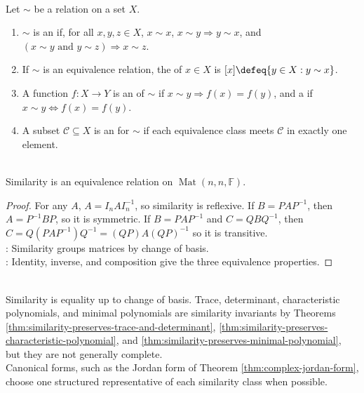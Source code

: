 \begin{definition} \label{def:equivalence-relation} \label{def:equivalence-classes-invariants-canonical-forms} \\
Let $\sim$ be a relation on a set $X$.
\begin{enumerate}[label=(\roman*)]
\setlength{\itemsep}{0pt}
\item $\sim$ is an  if, for all $x,y,z\in X$, $x\sim x$, $x\sim y\Rightarrow y\sim x$, and $(x\sim y\text{ and }y\sim z)\Rightarrow x\sim z$.
\item If $\sim$ is an equivalence relation, the  of $x\in X$ is $[x]\defeq\{y\in X:y\sim x\}$.
\item A function $f:X\to Y$ is an  of $\sim$ if $x\sim y\Rightarrow f(x)=f(y)$, and a  if $x\sim y\Longleftrightarrow f(x)=f(y)$.
\item A subset $\mathcal{C}\subseteq X$ is an  for $\sim$ if each equivalence class meets $\mathcal{C}$ in exactly one element.
\end{enumerate}
\end{definition}

\begin{proposition} \label{prop:similarity-equivalence-relation} \\
Similarity is an equivalence relation on $\operatorname{Mat}(n,n,\mathbb{F})$.
\begin{proof}
For any $A$, $A=I_nAI_n^{-1}$, so similarity is reflexive. If $B=PAP^{-1}$, then $A=P^{-1}BP$, so it is symmetric. If $B=PAP^{-1}$ and $C=QBQ^{-1}$, then $C=Q(PAP^{-1})Q^{-1}=(QP)A(QP)^{-1}$ so it is transitive.\\
: Similarity groups matrices by change of basis.\\
: Identity, inverse, and composition give the three equivalence properties.
\end{proof}
\end{proposition}

\begin{perspective} \label{per:similarity-invariants-and-canonical-forms} \\
Similarity is equality up to change of basis. Trace, determinant, characteristic polynomials, and minimal polynomials are similarity invariants by Theorems \ref{thm:similarity-preserves-trace-and-determinant}, \ref{thm:similarity-preserves-characteristic-polynomial}, and \ref{thm:similarity-preserves-minimal-polynomial}, but they are not generally complete.\\
Canonical forms, such as the Jordan form of Theorem \ref{thm:complex-jordan-form}, choose one structured representative of each similarity class when possible.
\end{perspective}
